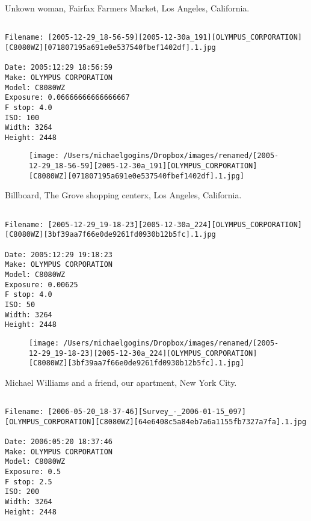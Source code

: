 \clearpage
\onecolumn
\noindent Unkown woman, Fairfax Farmers Market, Los Angeles, California.
\noindent
\begin{lstlisting}

Filename: [2005-12-29_18-56-59][2005-12-30a_191][OLYMPUS_CORPORATION][C8080WZ][071807195a691e0e537540fbef1402df].1.jpg

Date: 2005:12:29 18:56:59
Make: OLYMPUS CORPORATION
Model: C8080WZ
Exposure: 0.06666666666666667
F stop: 4.0
ISO: 100
Width: 3264
Height: 2448
\end{lstlisting}
\clearpage

\begin{figure}
\texttt{[image: /Users/michaelgogins/Dropbox/images/renamed/[2005-12-29\_18-56-59][2005-12-30a\_191][OLYMPUS\_CORPORATION][C8080WZ][071807195a691e0e537540fbef1402df].1.jpg]}
\end{figure}
    
\clearpage
\onecolumn
\noindent Billboard, The Grove shopping centerx, Los Angeles, California.
\noindent
\begin{lstlisting}

Filename: [2005-12-29_19-18-23][2005-12-30a_224][OLYMPUS_CORPORATION][C8080WZ][3bf39aa7f66e0de9261fd0930b12b5fc].1.jpg

Date: 2005:12:29 19:18:23
Make: OLYMPUS CORPORATION
Model: C8080WZ
Exposure: 0.00625
F stop: 4.0
ISO: 50
Width: 3264
Height: 2448
\end{lstlisting}
\clearpage

\begin{figure}
\texttt{[image: /Users/michaelgogins/Dropbox/images/renamed/[2005-12-29\_19-18-23][2005-12-30a\_224][OLYMPUS\_CORPORATION][C8080WZ][3bf39aa7f66e0de9261fd0930b12b5fc].1.jpg]}
\end{figure}
    
\clearpage
\onecolumn
\noindent Michael Williams and a friend, our apartment, New York City.
\noindent
\begin{lstlisting}

Filename: [2006-05-20_18-37-46][Survey_-_2006-01-15_097][OLYMPUS_CORPORATION][C8080WZ][64e6408c5a84eb7a6a1155fb7327a7fa].1.jpg

Date: 2006:05:20 18:37:46
Make: OLYMPUS CORPORATION
Model: C8080WZ
Exposure: 0.5
F stop: 2.5
ISO: 200
Width: 3264
Height: 2448
\end{lstlisting}
\clearpage

